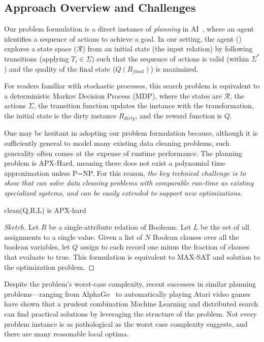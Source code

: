 \subsection{Approach Overview and Challenges}

Our problem formulation is a direct instance of {\it planning} in AI~\cite{russell1995modern}, where an agent identifies a sequence of actions to achieve a goal.  In our setting, the agent (\sys) explores a state space ($\mathcal{R}$) from an initial state (the input relation) by following transitions (applying $T_i \in \Sigma$) such that the sequence of actions is valid (within $\Sigma^*$) and the quality of the final state ($Q(R_{final})$) is maximized.  

For readers familiar with stochastic processes, this search problem is equivalent to a deterministic Markov Decision Process (MDP), where the states are $\mathcal{R}$, the actions $\Sigma$, the transition function updates the instance with the transformation, the initial state is the dirty instance $R_{dirty}$, and the reward function is $Q$.

One may be hesitant in adopting our problem formulation because, although it is sufficiently general to model many existing data cleaning problems, such generality often comes at the expense of runtime performance.   The planning problem is APX-Hard, meaning there does not exist a polynomial time approximation unless P=NP.  For this reason, {\it the key technical challenge is to show that \sys can solve data cleaning problems with comparable run-time as existing specialized systems, and can be easily extended to support new optimizations.}

\begin{theorem}[Hardness]
\textsf{clean}(Q,R,L) is APX-hard
\end{theorem}
\begin{proof}[Sketch]
Let $R$ be a single-attribute relation of Booleans. Let $L$ be the set of all assignments to a single value.
Given a list of $N$ Boolean clauses over all the boolean variables, let $Q$ assign to each record one minus the fraction of clauses that evaluate to true. This formulation is equivalent to MAX-SAT and solution to the optimization problem. 
\end{proof}

Despite the problem's worst-case complexity, 
recent successes in similar planning problems---ranging from AlphaGo~\cite{silver2016mastering} to automatically playing Atari video games~\cite{mnih2015human} have shown that a prudent combination Machine Learning and distributed search can find practical solutions by leveraging the structure of the problem. 
Not every problem instance is as pathological as the worst case complexity suggests, and there are many reasonable local optima.

